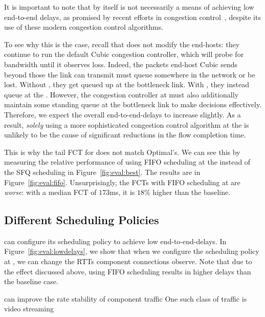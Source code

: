  It is important to note that \name by itself is not necessarily a means of achieving low end-to-end delays, as promised by recent efforts in congestion control~\cite{copa, nimbus}, despite its use of these modern congestion control algorithms.

To see why this is the case, recall that \name does not modify the end-hosts: they continue to run the default Cubic congestion controller, which will probe for bandwidth until it observes loss.
Indeed, the packets end-host Cubic sends beyond those the link can transmit must queue somewhere in the network or be lost. Without \name, they get queued up at the bottleneck link.
With \name, they instead queue at the \inbox.
However, the congestion controller at \inbox must also additionally maintain some standing queue at the bottleneck link to make decisions effectively.
Therefore, we expect the overall end-to-end-delays to increase slightly.
As a result, \emph{solely} using a more sophisticated congestion control algorithm at the \name is unlikely to be the cause of significant reductions in the flow completion time.

This is why the tail FCT for \name does not match Optimal's.
We can see this by measuring the relative performance of using FIFO scheduling at the \name instead of the SFQ scheduling in Figure~\ref{fig:eval:best}.
The results are in Figure~\ref{fig:eval:fifo}. 
Unsurprisingly, the FCTs with FIFO scheduling at \name are \emph{worse}: with a median FCT of $173$ms, it is $18$\% higher than the baseline. 


\subsection{Different Scheduling Policies}\label{s:eval:policies}


\name can configure its scheduling policy to achieve low end-to-end-delays.
In Figure~\ref{fig:eval:lowdelays}, we show that when we configure the scheduling policy at \inbox, we can change the RTTs component connections observe.
Note that due to the effect discussed above, using FIFO scheduling results in higher delays than the baseline case.

\label{s:eval:ratestable}

\begin{outline}
    \1 \name can improve the rate stability of component traffic
    \1 One such class of traffic is video streaming
\end{outline}

